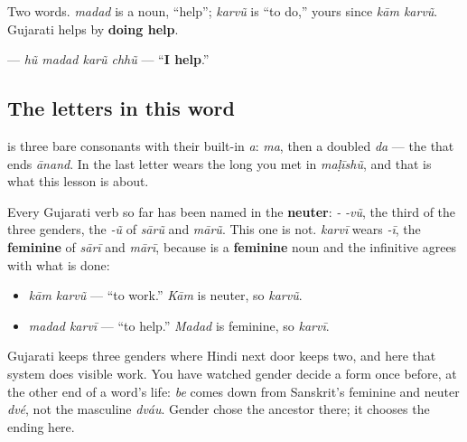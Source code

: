 Two words. \textbf{} \emph{madad} is a noun, \textquotedblleft{}help\textquotedblright{}; \textbf{} \emph{karvũ} is \textquotedblleft{}to do,\textquotedblright{} yours since \emph{kām karvũ}. Gujarati helps by \textbf{doing help}.

\textbf{   } — \emph{hũ madad karũ chhũ} — \textquotedblleft{}\textbf{I help}.\textquotedblright{}

\subsection*{The letters in this word}
\textbf{} is three bare consonants with their built-in \emph{a}: \textbf{} \emph{ma}, then a doubled \textbf{} \emph{da} — the \textbf{} that ends \emph{ānand}. In \textbf{} the last letter wears the long \textbf{} you met in \emph{maḷīshũ}, and that \textbf{} is what this lesson is about.

\begin{grammarlens}[title={Grammar Lens: the ending that stopped being neuter}]
Every Gujarati verb so far has been named in the \textbf{neuter}: \emph{-} \emph{-vũ}, the third of the three genders, the \emph{-ũ} of \emph{sārũ} and \emph{mārũ}. This one is not. \textbf{} \emph{karvī} wears \emph{-ī}, the \textbf{feminine} of \emph{sārī} and \emph{mārī}, because \textbf{} is a \textbf{feminine} noun and the infinitive agrees with what is done:

\begin{itemize}
\raggedright
  \item \textbf{ } \emph{kām karvũ} — \textquotedblleft{}to work.\textquotedblright{} \emph{Kām} is neuter, so \emph{karvũ}.
  \item \textbf{ } \emph{madad karvī} — \textquotedblleft{}to help.\textquotedblright{} \emph{Madad} is feminine, so \emph{karvī}.
\end{itemize}

Gujarati keeps three genders where Hindi next door keeps two, and here that system does visible work. You have watched gender decide a form once before, at the other end of a word's life: \textbf{} \emph{be} comes down from Sanskrit's feminine and neuter \emph{dvé}, not the masculine \emph{dváu}. Gender chose the ancestor there; it chooses the ending here.
\end{grammarlens}

